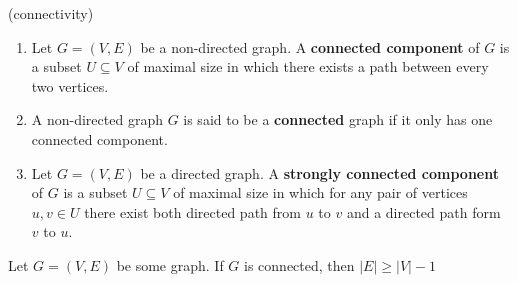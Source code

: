 \begin{definition} (connectivity)
\begin{enumerate}
  \item Let $ G =\left( V,E \right)$ be a non-directed graph. A \textbf{connected component} of $G$ is a subset $U \subseteq V$ of maximal size in which there exists a path between every two vertices. 
\item A non-directed graph $G$ is said to be a \textbf{connected} graph if it only has one connected component.
\item Let $ G = \left(V, E\right)$ be a directed graph. A \textbf{strongly connected component} of $G$ is a subset $U \subseteq V$ of maximal size in which for any pair of vertices $u,v \in U$ there exist both directed path from $u$ to $v$ and a directed path form $v$ to $u$.   
\end{enumerate}
\end{definition}
%

\begin{prop}
Let $G=(V,E)$ be some graph. If $G$ is connected, then $|E| \geq |V|-1$
\end{prop}

